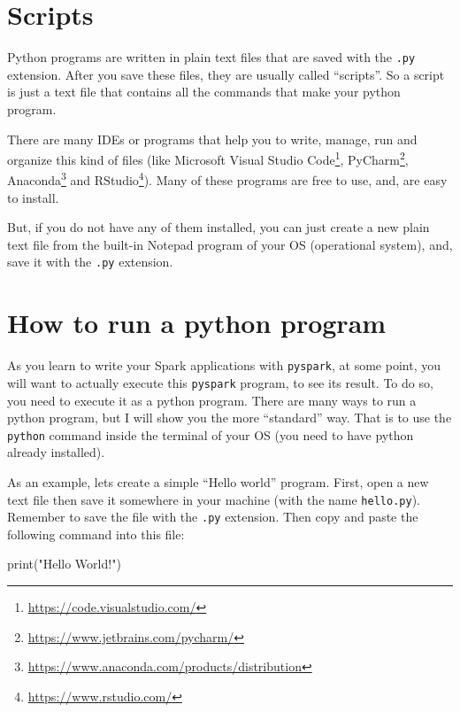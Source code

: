 \documentclass[
  11pt,
  letterpaper,
  DIV=11,
  numbers=noendperiod]{scrreprt}
\newenvironment{Shaded}{\begin{snugshade}}{\end{snugshade}}
\newcommand{\BuiltInTok}[1]{\textcolor[rgb]{0.00,0.23,0.31}{#1}}
\newcommand{\NormalTok}[1]{\textcolor[rgb]{0.00,0.23,0.31}{#1}}
\newcommand{\StringTok}[1]{\textcolor[rgb]{0.13,0.47,0.30}{#1}}
\begin{document}
\hypertarget{scripts}{%
\section{Scripts}\label{scripts}}

Python programs are written in plain text files that are saved with the
\texttt{.py} extension. After you save these files, they are usually
called ``scripts''. So a script is just a text file that contains all
the commands that make your python program.

There are many IDEs or programs that help you to write, manage, run and
organize this kind of files (like Microsoft Visual Studio
Code\footnote{\url{https://code.visualstudio.com/}}, PyCharm\footnote{\url{https://www.jetbrains.com/pycharm/}},
Anaconda\footnote{\url{https://www.anaconda.com/products/distribution}}
and RStudio\footnote{\url{https://www.rstudio.com/}}). Many of these
programs are free to use, and, are easy to install.

But, if you do not have any of them installed, you can just create a new
plain text file from the built-in Notepad program of your OS
(operational system), and, save it with the \texttt{.py} extension.

\hypertarget{how-to-run-a-python-program}{%
\section{How to run a python
program}\label{how-to-run-a-python-program}}

As you learn to write your Spark applications with \texttt{pyspark}, at
some point, you will want to actually execute this \texttt{pyspark}
program, to see its result. To do so, you need to execute it as a python
program. There are many ways to run a python program, but I will show
you the more ``standard'' way. That is to use the \texttt{python}
command inside the terminal of your OS (you need to have python already
installed).

As an example, lets create a simple ``Hello world'' program. First, open
a new text file then save it somewhere in your machine (with the name
\texttt{hello.py}). Remember to save the file with the \texttt{.py}
extension. Then copy and paste the following command into this file:

\begin{Shaded}
\begin{Highlighting}[]
\BuiltInTok{print}\NormalTok{(}\StringTok{"Hello World!"}\NormalTok{)}
\end{Highlighting}
\end{Shaded}
\end{document}
